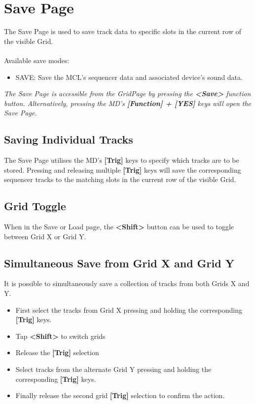 \chapter{Save Page}

The Save Page is used to save track data to specific slots in the current row of the visible  Grid.\\
\\
Available save modes:
\begin{itemize}
    \item SAVE: Save the MCL's sequencer data and associated device's sound data.
\end{itemize}


\textit{The Save Page is accessible from the GridPage by pressing the \textbf{<Save>} function button. Alternatively, pressing the MD's \textbf{[Function] + [YES]} keys will open the Save Page.}

\newpage
\section{Saving Individual Tracks}
The Save Page utilises the MD's \textbf{[Trig]} keys to specify which tracks are to be stored. Pressing and releasing multiple \textbf{[Trig]} keys will  save the corresponding sequencer tracks to the matching slots in the current row of the visible Grid.
\section{Grid Toggle}
When in the Save or Load page, the \textbf{<Shift>} button can be used to toggle between Grid X or Grid Y.
\section{Simultaneous Save from Grid X and Grid Y}
It is possible to simultaneously save a collection of tracks from both Grids X and Y. 
\begin{itemize}
\item First select the tracks from Grid X pressing and holding the corresponding \textbf{[Trig]} keys.
\item Tap \textbf{<Shift>} to switch grids
\item Release the \textbf{[Trig]} selection
\item Select tracks from the alternate Grid Y pressing and holding the corresponding \textbf{[Trig]} keys. 
\item Finally release the second grid \textbf{[Trig]} selection to confirm the action. 
\end{itemize}

